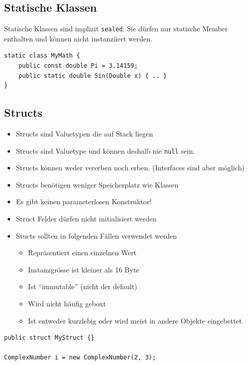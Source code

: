 \subsection{Statische Klassen}
Statische Klassen sind implizit \lstinline|sealed|. Sie dürfen nur statische Member enthalten und können nicht instanziiert werden.
\begin{lstlisting}
static class MyMath {
	public const double Pi = 3.14159;
	public static double Sin(Double x) { .. }
}
\end{lstlisting}
\clearpage

\subsection{Structs}
\begin{itemize}
	\item Structs sind Valuetypen die auf Stack liegen
	\item Structs sind Valuetype und können deshalb nie \lstinline[]|null| sein.
	\item Structs können weder vererben noch erben. (Interfaces sind aber möglich)
	\item Structs benötigen weniger Speicherplatz wie Klassen
	\item Es gibt keinen parameterlosen Konstruktor!
	\item Struct Felder dürfen nicht initialisiert werden
	\item Stucts sollten in folgenden Fällen verwendet werden
	\begin{itemize}
		\item Repräsentiert einen einzelnen Wert
		\item Instanzgrösse ist kleiner als 16 Byte
		\item Ist “immutable” (nicht der default)
		\item Wird nicht häufig geboxt
		\item Ist entweder kurzlebig oder wird meist in andere Objekte eingebettet
	\end{itemize}
\end{itemize}
\begin{lstlisting}
public struct MyStruct {}

ComplexNumber i = new ComplexNumber(2, 3);
\end{lstlisting}

